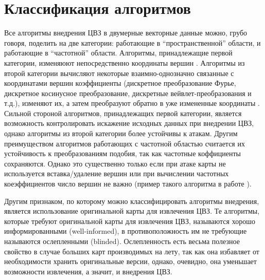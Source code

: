 \section{Классификация алгоритмов}
\label{sec:classification}
Все алгоритмы внедрения ЦВЗ в двумерные векторные данные можно, грубо говоря, поделить на две категории: 
работающие в ``пространственной'' области, и работающие в ``частотной'' области. 
Алгоритмы, принадлежащие первой категории, изменяюют непосредственно 
координаты вершин \cite{Kim, Chang, Bazin}. Алгоритмы из второй категории вычисляют некоторые 
взаимно-однозначно связанные с координатами вершин коэффициенты (дискретное преобразование Фурье, 
дискретное косинусное преобразование, дискретные вейвлет-преобразования и т.д.), изменяют их, а затем 
преобразуют обратно в уже измененные координаты \cite{Voight, Ohbuchi, Ohbuchi3D, Praun}.  
Сильной стороной алгоритмов, принадлежащих первой категории, является возможность контролировать искажение
исходных данных при внедрении ЦВЗ, однако алгоритмы из второй категории более устойчивы к атакам.
Другим преимуществом алгоритмов работающих с частотной областью считается их устойчивость к преобразованиям
подобия, так как частотные коффициенты сохраняются.
Однако это существенно только если при атаке карты не используется вставка/удаление вершин или 
при вычислении частотных коеэффициентов число вершин не важно (пример такого алгоритма в работе \cite{Shao}). 

Другим признаком, по которому можно классифицировать алгоритмы внедрения, является использование 
оригинальной карты для извлечения ЦВЗ. Те алгоритмы, которые требуют оригинальной карты для извлечения ЦВЗ,
называются хорошо информированными (well-informed), в противоположность им не требующие называются ослепленными
(blinded). Ослепленность есть весьма полезное свойство в случае больших карт производимых на лету, 
так как она избавляет от необходимости хранить оригинальные версии, однако, очевидно, она уменьшает возможности
извлечения, а значит, и внедрения ЦВЗ.
